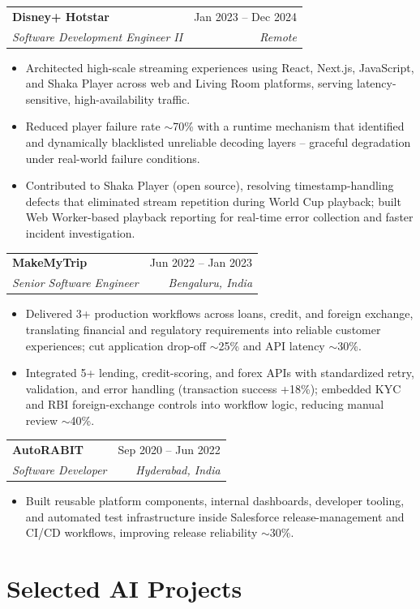 \documentclass[10.5pt,letterpaper]{article}
\makeatletter
\newcommand{\resumeItem}[1]{\item\small{#1}}
\newcommand{\resumeSubheading}[4]{
  \vspace{4pt}\noindent
  \begin{tabular*}{\textwidth}{l@{\extracolsep{\fill}}r}
    \textbf{#1} & #2 \\
    \textit{\small #3} & \textit{\small #4} \\
  \end{tabular*}\vspace{-2pt}
}
\makeatother
\begin{document}
\resumeSubheading{Disney+ Hotstar}{Jan 2023 -- Dec 2024}{Software Development Engineer II}{Remote}
\begin{itemize}
    \resumeItem{Architected high-scale streaming experiences using React, Next.js, JavaScript, and Shaka Player across web and Living Room platforms, serving latency-sensitive, high-availability traffic.}
    \resumeItem{Reduced player failure rate $\sim$70\% with a runtime mechanism that identified and dynamically blacklisted unreliable decoding layers -- graceful degradation under real-world failure conditions.}
    \resumeItem{Contributed to Shaka Player (open source), resolving timestamp-handling defects that eliminated stream repetition during World Cup playback; built Web Worker-based playback reporting for real-time error collection and faster incident investigation.}
\end{itemize}

\resumeSubheading{MakeMyTrip}{Jun 2022 -- Jan 2023}{Senior Software Engineer}{Bengaluru, India}
\begin{itemize}
    \resumeItem{Delivered 3+ production workflows across loans, credit, and foreign exchange, translating financial and regulatory requirements into reliable customer experiences; cut application drop-off $\sim$25\% and API latency $\sim$30\%.}
    \resumeItem{Integrated 5+ lending, credit-scoring, and forex APIs with standardized retry, validation, and error handling (transaction success +18\%); embedded KYC and RBI foreign-exchange controls into workflow logic, reducing manual review $\sim$40\%.}
\end{itemize}

\resumeSubheading{AutoRABIT}{Sep 2020 -- Jun 2022}{Software Developer}{Hyderabad, India}
\begin{itemize}
    \resumeItem{Built reusable platform components, internal dashboards, developer tooling, and automated test infrastructure inside Salesforce release-management and CI/CD workflows, improving release reliability $\sim$30\%.}
\end{itemize}

\section*{Selected AI Projects}
\end{document}
